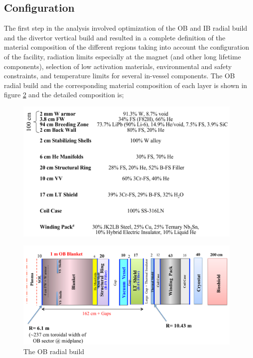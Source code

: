 \documentclass[12pt, letterpaper]{elsarticle}
\begin{document}
\subsection{Configuration}
The first step in the analysis involved optimization of the OB and IB radial build and the divertor vertical build and resulted in a complete definition of the material composition of the different regions taking into account the configuration of the facility, radiation limits especially at the magnet (and other long lifetime components), selection of low activation materials, environmental and safety constraints, and temperature limits for several in-vessel components. The OB radial build and the corresponding material composition of each layer is shown in figure \ref{fig:OB_radial} and the detailed composition is;
\begin{figure}[h!]
  \centering
  \includegraphics[scale=0.2]{../plots/OB_comp.png}
  \label{fig:OB_comp}
\end{figure}
\begin{figure}[h!]
  \centering
  \includegraphics[scale=0.2]{../plots/OB_radial.png}
  \caption{The OB radial build}
  \label{fig:OB_radial}
\end{figure}
\end{document}
